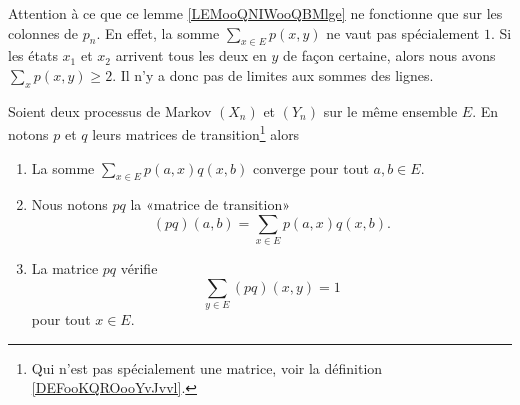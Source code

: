\begin{remark}
	Attention à ce que ce lemme \ref{LEMooQNIWooQBMlge} ne fonctionne que sur les colonnes de \( p_n\). En effet, la somme \( \sum_{x\in E}p(x,y)\) ne vaut pas spécialement \( 1\). Si les états \( x_1\) et \( x_2\) arrivent tous les deux en \( y\) de façon certaine, alors nous avons \( \sum_xp(x,y)\geq 2\). Il n'y a donc pas de limites aux sommes des lignes.
\end{remark}

\begin{lemmaDef}         \label{LEMooZIEPooXHGnvy}
	Soient deux processus de Markov \( (X_n)\) et \( (Y_n)\) sur le même ensemble \( E\). En notons \( p\) et \( q\) leurs matrices de transition\footnote{Qui n'est pas spécialement une matrice, voir la définition \ref{DEFooKQROooYvJvvl}.} alors
	\begin{enumerate}
		\item       \label{ITEMooWNWXooCKOYpE}
		      La somme \( \sum_{x\in E}p(a,x)q(x,b)\) converge pour tout \( a,b\in E\).
		\item       \label{ITEMooEZIEooFEbwhj}
		      Nous notons \( pq\) la «matrice de transition»
		      \begin{equation}
			      (pq)(a,b)=\sum_{x\in E}p(a,x)q(x,b).
		      \end{equation}
		\item       \label{ITEMooKEFXooMLREkO}
		      La matrice \( pq\) vérifie
		      \begin{equation}
			      \sum_{y\in E}(pq)(x,y)=1
		      \end{equation}
		      pour tout \( x\in E\).
	\end{enumerate}
\end{lemmaDef}

